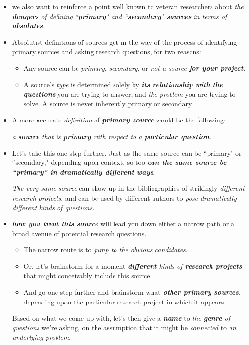 \documentclass[11pt]{article}
\begin{document}
\begin{itemize}
\item we also want to reinforce a point well known to veteran researchers about \emph{the \textbf{dangers} of defining ``\textbf{primary}" and ``\textbf{secondary}" \textbf{sources} in terms of \textbf{absolutes}}.

\item Absolutist definitions of sources get in the way of the process of identifying primary sources and asking research questions, for two reasons:
\begin{itemize}
\item Any source can be \emph{primary}, \emph{secondary}, or \emph{not a source} \emph{\textbf{for your project}}.
\item A source’s \emph{type} is determined solely by \emph{\textbf{its relationship with the questions}} you are trying to answer, and \emph{the problem} you are trying to solve. A source is never inherently primary or secondary.
\end{itemize}

\item A more accurate \emph{definition} of \emph{\textbf{primary source}} would be the following: 

\emph{a \textbf{source} that is \textbf{primary} with respect to a \textbf{particular question}}.

\item Let’s take this one step further. Just as the same source can be ``primary" or ``secondary," depending upon context, so too \emph{\textbf{can the same source be ``primary" in dramatically different ways}}. 

\emph{The very same source} can show up in the bibliographies of strikingly \emph{different research projects}, and can be used by different authors to \emph{pose dramatically different kinds of questions}.

\item \emph{\textbf{how you treat this source}} will lead you down either a narrow path or a broad avenue of potential research questions.
\begin{itemize}
\item The narrow route is to \emph{jump to the obvious candidates}.
\item Or, let’s brainstorm for a moment \emph{\textbf{different} kinds of \textbf{research projects}} that might conceivably include this source 
\item And go one step further and brainstorm what \emph{\textbf{other primary sources}}, depending upon the particular research project in which it appears.
\end{itemize}
Based on what we come up with, let’s then give a \emph{\textbf{name}} to \emph{the \textbf{genre} of questions} we’re asking, on the assumption that it might be \emph{connected} to \emph{an underlying problem}.


\end{itemize}
\end{document}
